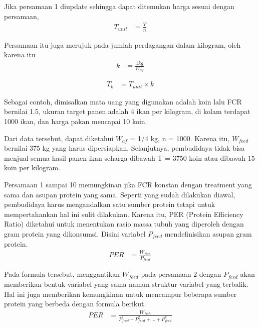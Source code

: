 Jika persamaan 1 diupdate sehingga dapat ditemukan harga sesuai dengan persamaan,
\begin{equation}
    \begin{split}
		T_{unit}
		&= \frac{T}{n}
    \end{split}
\end{equation}

Persamaan itu juga merujuk pada jumlah perdagangan dalam kilogram, oleh karena itu
\begin{equation}
    \begin{split}
		k
		&= \frac{1kg}{W_{af}}
    \end{split}
\end{equation}

\begin{equation}
    \begin{split}
		T_k
		&= T_{unit} \times k
    \end{split}
\end{equation}

Sebagai contoh, dimisalkan mata uang yang digunakan adalah koin lalu FCR bernilai 1.5, ukuran target panen adalah 4 ikan per kilogram, di kolam terdapat 1000 ikan, dan harga pakan mencapai 10 koin.

Dari data tersebut, dapat diketahui $W_{af}$ = 1/4 kg, n = 1000. Karena itu, $W_{feed}$ bernilai 375 kg yang harus dipersiapkan. Selanjutnya, pembudidaya tidak bisa menjual semua hasil panen ikan seharga dibawah T = 3750 koin atau dibawah 15 koin per kilogram.

Persamaan 1 sampai 10 memungkinan jika FCR konstan dengan treatment yang sama dan asupan protein yang sama. Seperti yang sudah dilakukan diawal, pembudidaya harus mengandalkan satu sumber protein tetapi untuk mempertahankan hal ini sulit dilakukan. Karena itu, PER (Protein Efficiency Ratio) diketahui untuk menentukan rasio massa tubuh yang diperoleh dengan gram protein yang dikonsumsi. Disini variabel $P_{feed}$ mendefinisikan asupan gram protein.
\begin{equation}
    \begin{split}
		PER
		&= \frac{W_{fish}}{P_{feed}}
    \end{split}
\end{equation}

Pada formula tersebut, menggantikan $W_{feed}$ pada persamaan 2 dengan $P_{feed}$ akan memberikan bentuk variabel yang sama namun struktur variabel yang terbalik. Hal ini juga memberikan kemungkinan untuk mencampur beberapa sumber protein yang berbeda dengan formula berikut.
\begin{equation}
    \begin{split}
		PER
		&= \frac{W_{fish}}{P^1_{feed} + P^2_{feed} + \dots + P^k_{feed}}
    \end{split}
\end{equation}

